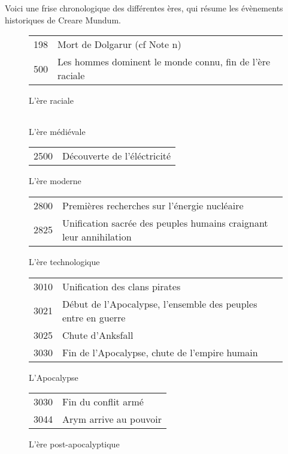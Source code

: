 \renewcommand{\arraystretch}{1.8}

Voici une frise chronologique des différentes ères, qui résume les évènements historiques de Creare Mundum.
\begin{figure}[ht]
\begin{tabular}{r | l}
198 & Mort de Dolgarur (cf Note n\degre236)\\
500 & Les hommes dominent le monde connu, fin de l'ère raciale
\end{tabular}
\caption{L'ère raciale}
\end{figure}

\begin{figure}[!ht]
\begin{tabular}{r | l}

\end{tabular}
\caption{L'ère médiévale}
\end{figure}

\begin{figure}[!ht]
\begin{tabular}{r | l}
2500 & Découverte de l'éléctricité
\end{tabular}
\caption{L'ère moderne}
\end{figure}

\begin{figure}[!ht]
\begin{tabular}{r | l}
2800 & Premières recherches sur l'énergie nucléaire \\
2825 & Unification sacrée des peuples humains craignant leur annihilation
\end{tabular}
\caption{L'ère technologique}
\end{figure}

\begin{figure}[!ht]
\begin{tabular}{r | l}
3010 & Unification des clans pirates\\
3021 & Début de l'Apocalypse, l'ensemble des peuples entre en guerre\\
3025 & Chute d'Anksfall\\
3030 & Fin de l'Apocalypse, chute de l'empire humain
\end{tabular}
\caption{L'Apocalypse}
\end{figure}

\begin{figure}[!ht]
\begin{tabular}{r | l}
3030 & Fin du conflit armé\\
3044 & Arym arrive au pouvoir\\
\end{tabular}
\caption{L'ère post-apocalyptique}
\end{figure}